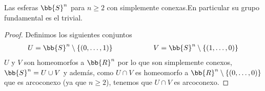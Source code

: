 \begin{coro}
    Las esferas $\bb{S}^n$ para $n\geq 2$ con simplemente conexas.En particular su grupo fundamental es el trivial.

    \begin{proof}
        Definimos los siguientes conjuntos
        \begin{gather*}
            U=\bb{S}^n \setminus \{(0,\dots,1)\} \hspace{2cm} 
            V = \bb{S}^n \setminus \{(1,\dots,0)\}
        \end{gather*}
        $U$ y $V$ son homeomorfos a $\bb{R}^n$ por lo que son simplemente conexos, $\bb{S}^n=U\cup V$ y además, como $U\cap V$ es homeomorfo a $\bb{R}^n \setminus \{(0,\dots,0)\}$ que es arcoconexo (ya que $n\geq 2$), tenemos que $U\cap V$ es arcoconexo.
    \end{proof}
\end{coro}

